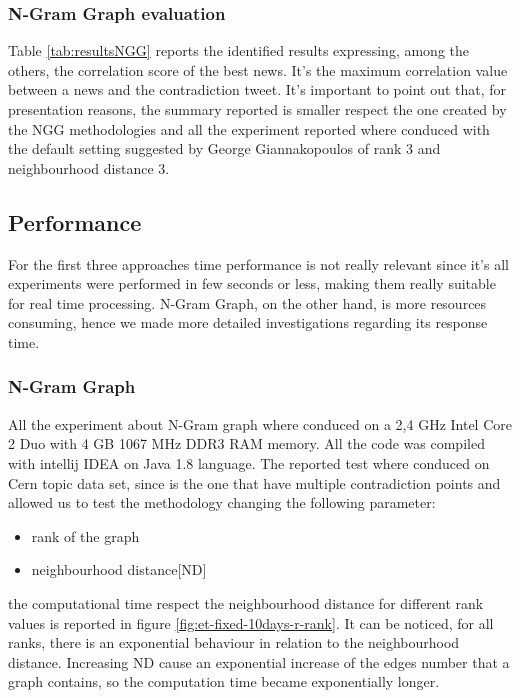 \subsubsection*{N-Gram Graph evaluation}
Table \ref{tab:resultsNGG} reports the identified results expressing, among the others, the correlation score of the best news. It's the maximum correlation value between a news and the contradiction tweet.
It's important to point out that, for presentation reasons, the summary reported is smaller respect the one created by the NGG methodologies and all the experiment reported where conduced with the default setting suggested by George Giannakopoulos of rank 3 and neighbourhood distance 3.









\subsection*{Performance}
For the first three approaches time performance is not really relevant since it's all experiments were performed in few seconds or less, making them really suitable for real time processing. N-Gram Graph, on the other hand, is more resources consuming, hence we made more detailed investigations regarding its  response time.

\subsubsection*{N-Gram Graph }
All the experiment about N-Gram graph where conduced on a 2,4 GHz Intel Core 2 Duo with 4 GB 1067 MHz DDR3 RAM memory.
 All the code was compiled with intellij IDEA on Java 1.8 language. 
The reported test where conduced on Cern topic data set, since is the one that have multiple contradiction points and allowed us to test the methodology changing the following parameter:
\begin{itemize}
	\item rank of the graph
	\item neighbourhood distance[ND]
\end{itemize}


the computational time respect the neighbourhood distance for different rank values is reported in figure \ref{fig:et-fixed-10days-r-rank}.
It can be noticed, for all ranks, there is an exponential behaviour in relation to the neighbourhood distance. 
Increasing ND cause an exponential increase of the edges number that a graph contains, so the computation time became exponentially longer.

